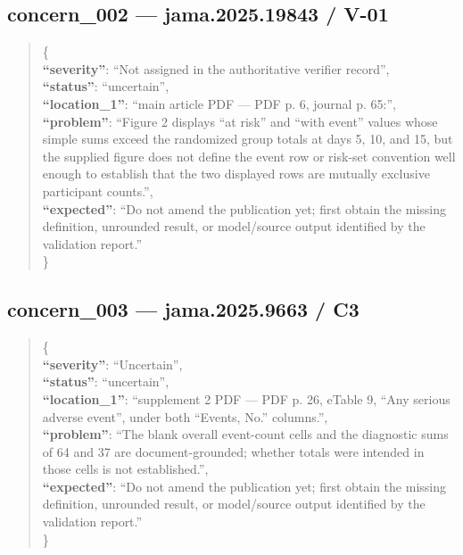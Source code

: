 \documentclass[
  letterpaper,
  9pt]{extreport}
\begin{document}
\hypertarget{concern_002--jama202519843--v-01}{%
\subsection{concern\_002 --- jama.2025.19843 /
V-01}\label{concern_002--jama202519843--v-01}}

\begin{quote}
\{\\
\textbf{``severity''}: ``Not assigned in the authoritative verifier
record'',\\
\textbf{``status''}: ``uncertain'',\\
\textbf{``location\_1''}: ``main article PDF --- PDF p. 6, journal p.
65:'',\\
\textbf{``problem''}: ``Figure 2 displays ``at risk'' and ``with event''
values whose simple sums exceed the randomized group totals at days 5,
10, and 15, but the supplied figure does not define the event row or
risk-set convention well enough to establish that the two displayed rows
are mutually exclusive participant counts.'',\\
\textbf{``expected''}: ``Do not amend the publication yet; first obtain
the missing definition, unrounded result, or model/source output
identified by the validation report.''\\
\}
\end{quote}

\hypertarget{concern_003--jama20259663--c3}{%
\subsection{concern\_003 --- jama.2025.9663 /
C3}\label{concern_003--jama20259663--c3}}

\begin{quote}
\{\\
\textbf{``severity''}: ``Uncertain'',\\
\textbf{``status''}: ``uncertain'',\\
\textbf{``location\_1''}: ``supplement 2 PDF --- PDF p. 26, eTable 9,
``Any serious adverse event'', under both ``Events, No.'' columns.'',\\
\textbf{``problem''}: ``The blank overall event-count cells and the
diagnostic sums of 64 and 37 are document-grounded; whether totals were
intended in those cells is not established.'',\\
\textbf{``expected''}: ``Do not amend the publication yet; first obtain
the missing definition, unrounded result, or model/source output
identified by the validation report.''\\
\}
\end{quote}
\end{document}

